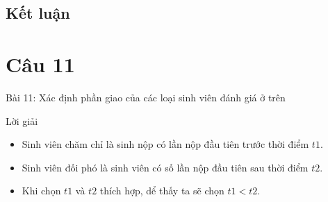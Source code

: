 \documentclass[english,10pt,table]{beamer}
\begin{document}
\subsection{Kết luận}
\section{Câu 11}
\begin{frame}{Bài 11: Xác định phần giao của các loại sinh viên đánh giá ở trên}
   \begin{block}{Lời giải}
   \begin{itemize}
    \item Sinh viên chăm chỉ là sinh nộp có lần nộp đầu tiên trước thời điểm $t1$.
    \item Sinh viên đối phó là sinh viên có số lần nộp đầu tiên sau thời điểm $t2$.
    \item Khi chọn $t1$ và $t2$ thích hợp, dể thấy ta sẽ chọn $t1 < t2$.
\end{itemize}
   \end{block}
\end{frame}
\end{document}
